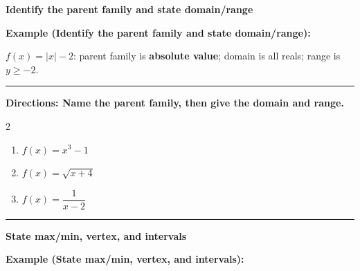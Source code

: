 \documentclass[12pt]{article}
\begin{document}
\vspace{0.35cm}

\begin{center}{\Large \textbf{Identify the parent family and state domain/range}}\end{center}\vspace{0.2cm}
\textbf{Example (Identify the parent family and state domain/range):}

$f(x)=|x|-2$: parent family is \textbf{absolute value}; domain is all reals; range is $y\ge -2$.

\vspace{0.2cm}\hrule\vspace{0.35cm}
\textbf{Directions: Name the parent family, then give the domain and range.}

\begin{multicols}{2}
\begin{enumerate}[label=\textbf{\arabic*.}, start=1, itemsep=1.3cm]
  \item $\displaystyle f(x)=x^{3}-1$
  \item $\displaystyle f(x)=\sqrt{x+4}$
  \item $\displaystyle f(x)=\dfrac{1}{x-2}$
\end{enumerate}
\end{multicols}
\vspace{0.25cm}\hrule\vspace{0.35cm}

\begin{center}{\Large \textbf{State max/min, vertex, and intervals}}\end{center}\vspace{0.2cm}
\textbf{Example (State max/min, vertex, and intervals):}
\end{document}
